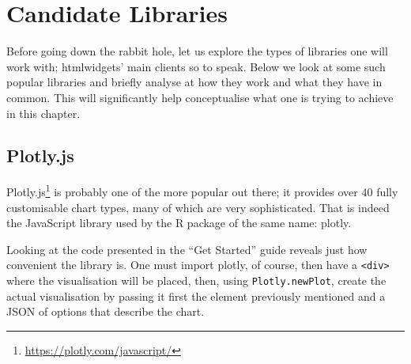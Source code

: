\documentclass[10pt,]{krantz}
\renewcommand{\href}[2]{#2\footnote{\url{#1}}}
\begin{document}
\hypertarget{widgets-basics-candidates}{%
\section{Candidate Libraries}\label{widgets-basics-candidates}}

Before going down the rabbit hole, let us explore the types of libraries one will work with; htmlwidgets' main clients so to speak. Below we look at some such popular libraries and briefly analyse at how they work and what they have in common. This will significantly help conceptualise what one is trying to achieve in this chapter.

\hypertarget{widgets-basics-candidates-plotly}{%
\subsection{Plotly.js}\label{widgets-basics-candidates-plotly}}

\href{https://plotly.com/javascript/}{Plotly.js} is probably one of the more popular out there; it provides over 40 fully customisable chart types, many of which are very sophisticated. That is indeed the JavaScript library used by the R package of the same name: plotly.

Looking at the code presented in the ``Get Started'' guide reveals just how convenient the library is. One must import plotly, of course, then have a \texttt{\textless{}div\textgreater{}} where the visualisation will be placed, then, using \texttt{Plotly.newPlot}, create the actual visualisation by passing it first the element previously mentioned and a JSON of options that describe the chart.
\end{document}
